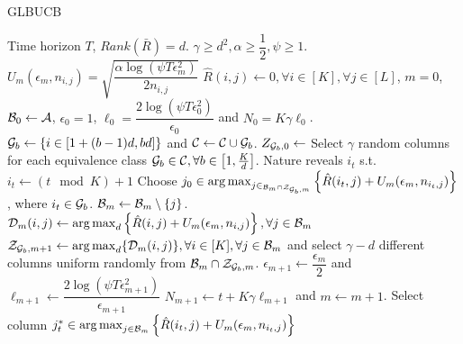 \begin{algorithm}[!th]
\caption{GLBUCB}
\label{alg:NGLB}
\begin{algorithmic}[1]
 Time horizon $T$, $Rank(\bar{R}) = d$.
 $\gamma \geq d^2, \alpha \geq  \dfrac{1}{2}, \psi \geq 1$.
 $U_m(\epsilon_m, n_{i,j}) = \sqrt{\dfrac{\alpha\log(\psi T\epsilon_m^2)}{2n_{i,j}} }$
 $\hat{R}(i,j) \leftarrow 0, \forall i\in [K], \forall j\in [L]$, $m=0$, $\mathcal{B}_0 \leftarrow \mathcal{A}$, $\epsilon_0=1$, $\ell_0 =  \dfrac{2\log(\psi T\epsilon_{0}^2)}{\epsilon_{0}} $ and $N_0 =  K\gamma \ell_0 $.
 
\State  $\mathcal{G}_{b}\leftarrow \left\lbrace i\in \left[1+(b-1)d, bd\right]\right\rbrace$ and $\mathcal{C}\leftarrow \mathcal{C}\cup \mathcal{G}_{b}$.
\EndFor
\State $Z_{\mathcal{G}_b, 0}\leftarrow$ Select $\gamma$ random columns for each equivalence class $\mathcal{G}_b\in\mathcal{C}, \forall b\in \left[1,\frac{K}{d}\right] $. %
\State Nature reveals $i_t$ s.t. $i_t \leftarrow (t \mod K) + 1$ 
  
\State Choose $j_0 \in \mathop{\rm arg\,max}_{j\in_{\mathcal{B}_m\cap \mathcal{Z}_{\mathcal{G}_b,m}}}\left\lbrace \hat{R}(i_t,j)  + U_m(\epsilon_m, n_{i_t,j})\right\rbrace $, where $i_t\in \mathcal{G}_b$.
\Else {}
\ColElim
\State {}
\State {}
\State $\mathcal{B}_m \leftarrow \mathcal{B}_m \setminus \lbrace j \rbrace$. 
\EndWhile
\EndFor
\EndColElim
\ResParam
{} 
\State $\mathcal{D}_{m}(i,j) \leftarrow \mathop{\rm arg\,max}_d\left\lbrace \hat{R}(i,j)  + U_m(\epsilon_m, n_{i,j})\right\rbrace, \forall j\in \mathcal{B}_m$
\EndFor
{} 
\State $\mathcal{Z}_{\mathcal{G}_b,m+1}\leftarrow \mathop{\rm arg\,max}_d\lbrace \mathcal{D}_m(i,j)\rbrace, \forall i\in [K], \forall j\in\mathcal{B}_m$ and select $\gamma - d$ different columns uniform randomly from $\mathcal{B}_m\cap\mathcal{Z}_{\mathcal{G}_b,m}$.
\EndFor
\State $\epsilon_{m+1} \leftarrow \dfrac{\epsilon_m}{2}$ and $\ell_{m+1} \leftarrow \dfrac{2\log(\psi T\epsilon_{m+1}^2)}{\epsilon_{m+1}}$
\State $N_{m+1}\leftarrow t + K \gamma \ell_{m+1} $ and $m \leftarrow m + 1$.
\EndResParam
\EndIf
\Else {}
\State  Select column $j_t^*\in \mathop{\rm arg\,max}_{j\in\mathcal{B}_m} \left\lbrace \hat{R}(i_t,j) + U_m(\epsilon_m, n_{i_t,j})\right\rbrace$ 
\EndIf
\EndFor
\end{algorithmic}
\end{algorithm}


